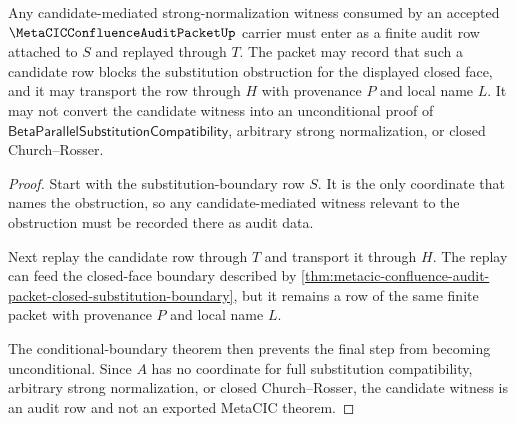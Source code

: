 \begin{theorem}
\label{thm:metacic-confluence-audit-candidate-mediated-sn}
Any candidate-mediated strong-normalization witness consumed by an accepted
$\MetaCICConfluenceAuditPacketUp$ carrier must enter as a finite audit row
attached to $S$ and replayed through $T$. The packet may record that such a
candidate row blocks the substitution obstruction for the displayed closed
face, and it may transport the row through $H$ with provenance $P$ and local
name $L$. It may not convert the candidate witness into an unconditional proof
of $\mathsf{BetaParallelSubstitutionCompatibility}$, arbitrary strong
normalization, or closed Church--Rosser.
\end{theorem}
\begin{proof}
Start with the substitution-boundary row $S$. It is the only coordinate that
names the obstruction, so any candidate-mediated witness relevant to the
obstruction must be recorded there as audit data.

Next replay the candidate row through $T$ and transport it through $H$. The
replay can feed the closed-face boundary described by
\autoref{thm:metacic-confluence-audit-packet-closed-substitution-boundary}, but
it remains a row of the same finite packet with provenance $P$ and local name
$L$.

The conditional-boundary theorem then prevents the final step from becoming
unconditional. Since $A$ has no coordinate for full substitution compatibility,
arbitrary strong normalization, or closed Church--Rosser, the candidate witness
is an audit row and not an exported MetaCIC theorem.
\end{proof}

